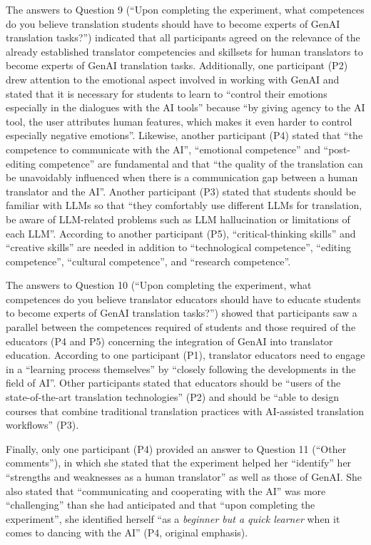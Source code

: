 \documentclass[output=paper,colorlinks,citecolor=brown]{langscibook}
\begin{document}
The answers to Question 9 (“Upon completing the experiment, what competences do you believe translation students should have to become experts of GenAI translation tasks?”) indicated that all participants agreed on the relevance of the already established translator competencies and skillsets for human translators to become experts of GenAI translation tasks. Additionally, one participant (P2) drew attention to the emotional aspect involved in working with GenAI and stated that it is necessary for students to learn to “control their emotions especially in the dialogues with the AI tools” because “by giving agency to the AI tool, the user attributes human features, which makes it even harder to control especially negative emotions”. Likewise, another participant (P4) stated that “the competence to communicate with the AI”, “emotional competence” and “post-editing competence” are fundamental and that “the quality of the translation can be unavoidably influenced when there is a communication gap between a human translator and the AI”. Another participant (P3) stated that students should be familiar with LLMs so that “they comfortably use different LLMs for translation, be aware of LLM-related problems such as LLM hallucination or limitations of each LLM”. According to another participant (P5), “critical-thinking skills” and “creative skills” are needed in addition to “technological competence”, “editing competence”, “cultural competence”, and “research competence”.

The answers to Question 10 (“Upon completing the experiment, what competences do you believe translator educators should have to educate students to become experts of GenAI translation tasks?”) showed that participants saw a parallel between the competences required of students and those required of the educators (P4 and P5) concerning the integration of GenAI into translator education. According to one participant (P1), translator educators need to engage in a “learning process themselves” by “closely following the developments in the field of AI”. Other participants stated that educators should be “users of the state-of-the-art translation technologies” (P2) and should be “able to design courses that combine traditional translation practices with AI-assisted translation workflows” (P3).

Finally, only one participant (P4) provided an answer to Question 11 (“Other comments”), in which she stated that the experiment helped her “identify” her “strengths and weaknesses as a human translator” as well as those of GenAI. She also stated that “communicating and cooperating with the AI” was more “challenging” than she had anticipated and that “upon completing the experiment”, she identified herself “as a \textit{beginner but a quick learner} when it comes to dancing with the AI” (P4, original emphasis).
\end{document}
